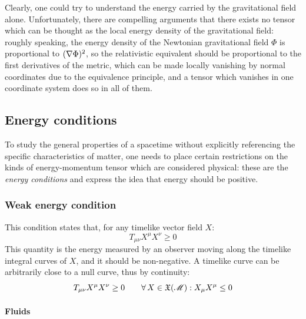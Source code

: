 Clearly, one could try to understand the energy carried by the gravitational field alone. Unfortunately, there are compelling arguments that there exists no tensor which can be thought as the local energy density of the gravitational field: roughly speaking, the energy density of the Newtonian gravitational field $ \Phi $ is proportional to $ (\nabla \Phi)^2 $, so the relativistic equivalent should be proportional to the first derivatives of the metric, which can be made locally vanishing by normal coordinates due to the equivalence principle, and a tensor which vanishes in one coordinate system does so in all of them.

\subsection{Energy conditions}

To study the general properties of a spacetime without explicitly referencing the specific characteristics of matter, one needs to place certain restrictions on the kinds of energy-momentum tensor which are considered physical: these are the \textit{energy conditions} and express the idea that energy should be positive.

\subsubsection{Weak energy condition}

This condition states that, for any timelike vector field $ X $:
\begin{equation*}
  T_{\mu \nu} X^\mu X^\nu \ge 0
\end{equation*}
This quantity is the energy measured by an observer moving along the timelike integral curves of $ X $, and it should be non-negative. A timelike curve can be arbitrarily close to a null curve, thus by continuity:
\begin{equation}
  T_{\mu \nu} X^\mu X^\nu \ge 0 \qquad \forall\, X \in \mathfrak{X}(\mathscr{M}) : X_\mu X^\mu \le 0
  \label{eq:weak-en-cond}
\end{equation}

\paragraph{Fluids}

